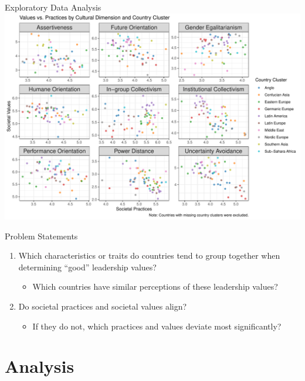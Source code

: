 \documentclass[
  ignorenonframetext,
]{beamer}
\providecommand{\tightlist}{%
  \setlength{\itemsep}{0pt}\setlength{\parskip}{0pt}}
\begin{document}
\begin{frame}{Exploratory Data Analysis}
\protect\hypertarget{exploratory-data-analysis-1}{}
\includegraphics{final_slides_files/figure-beamer/eda_social-1.pdf}
\end{frame}

\begin{frame}{Problem Statements}
\protect\hypertarget{problem-statements}{}
\begin{enumerate}
\tightlist
\item
  Which characteristics or traits do countries tend to group together
  when determining ``good'' leadership values?

  \begin{itemize}
  \tightlist
  \item
    Which countries have similar perceptions of these leadership values?
  \end{itemize}
\item
  Do societal practices and societal values align?

  \begin{itemize}
  \tightlist
  \item
    If they do not, which practices and values deviate most
    significantly?
  \end{itemize}
\end{enumerate}
\end{frame}

\hypertarget{analysis}{%
\section{Analysis}\label{analysis}}
\end{document}
